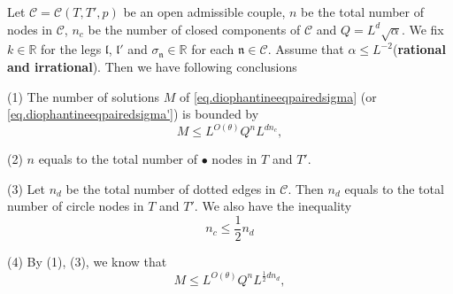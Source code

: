 \begin{prop}\label{prop.counting}
Let $\mathcal{C}=\mathcal{C}(T,T',p)$ be an open admissible couple, $n$ be the total number of nodes in $\mathcal{C}$, $n_c$ be the number of closed components of $\mathcal{C}$ and $Q=L^{d}\sqrt{\alpha}$. We fix $k\in \mathbb{R}$ for the legs $\mathfrak{l}$, $\mathfrak{l}'$ and $\sigma_{\mathfrak{n}}\in\mathbb{R}$ for each $\mathfrak{n}\in \mathcal{C}$. Assume that $\alpha\le L^{-2}$(\textbf{rational and irrational}). Then we have following conclusions

(1) The number of solutions $M$ of \eqref{eq.diophantineeqpairedsigma} (or \eqref{eq.diophantineeqpairedsigma'}) is bounded by 
\begin{equation}\label{eq.countingbd0}M\leq L^{O(\theta)} Q^{n} L^{dn_c}, 
\end{equation}

(2) $n$ equals to the total number of $\bullet$ nodes in $T$ and $T'$. 

(3) Let $n_d$ be the total number of dotted edges in $\mathcal{C}$. Then $n_d$ equals to the total number of circle nodes in $T$ and $T'$. We also have the inequality
\begin{equation}\label{eq.dottededgeclosedcomponent}
    n_c\le \frac{1}{2}n_d
\end{equation}

(4) By (1), (3), we know that 
\begin{equation}\label{eq.countingbd1}M\leq L^{O(\theta)} Q^{n} L^{\frac{1}{2} dn_d}, 
\end{equation}
\end{prop}
